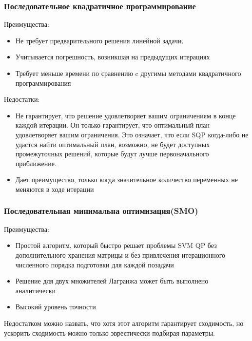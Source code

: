 \documentclass[main.tex]{subfiles}
\begin{document}
\subsubsection{Последовательное квадратичное программирование}
Преимущества:
\begin{itemize}
	\item Не требует предварительного решения линейной задачи.
	\item Учитывается погрешность, возникшая на предыдущих
	итерациях
	\item Требует меньше времени по сравнению c другимы методами квадратичного программирования
\end{itemize}
	

Недостатки:
\begin{itemize}
	\item Не гарантирует, что решение удовлетворяет вашим ограничениям в конце каждой итерации. Он только гарантирует, что оптимальный план удовлетворяет вашим ограничения. Это означает, что если SQP когда-либо не удастся найти оптимальный план, возможно, не будет доступных промежуточных решений, которые будут лучше первоначального приближение.
	\item Дает преимущество, только когда значительное количество
	переменных не меняются в ходе итерации

\end{itemize}

\subsubsection{Последовательная минимальна оптимизация(SMO)}
Преимущества:
\begin{itemize}
	\item Простой алгоритм, который быстро решает проблемы SVM QP без дополнительного хранения матрицы и без привлечения итерационного численного порядка подготовки для каждой позадачи
	\item Решение для двух множителей Лагранжа может быть выполнено
	аналитически
	\item Высокий уровень точности
\end{itemize}

Недостатком можно назвать, что хотя этот алгоритм гарантирует сходимость, но ускорить сходимость можно только эврестически подбирая параметры.
\end{document}
